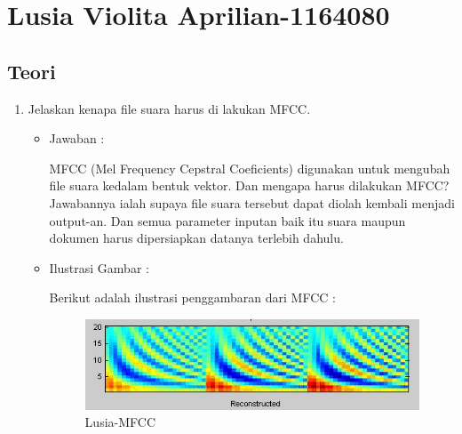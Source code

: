 \section{Lusia Violita Aprilian-1164080}

\subsection{Teori}

\begin{enumerate}
\item Jelaskan kenapa file suara harus di lakukan MFCC.
	\begin{itemize}
	\item Jawaban :
		\par MFCC (Mel Frequency Cepstral Coeficients) digunakan untuk mengubah file suara kedalam bentuk vektor. Dan mengapa harus dilakukan MFCC? Jawabannya ialah supaya file suara tersebut dapat diolah kembali menjadi output-an. Dan semua parameter inputan baik itu suara maupun dokumen harus dipersiapkan datanya terlebih dahulu. 
	\item Ilustrasi Gambar :
		\par Berikut adalah ilustrasi penggambaran dari MFCC :
		\begin{figure}[!hbtp]
		\centering
		\includegraphics[scale=0.4]{figures/s1.jpg}
		\caption{Lusia-MFCC}
		\label{6A1}
		\end{figure}
	\end{itemize}
	

\end{enumerate}
